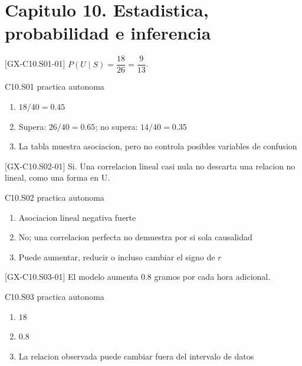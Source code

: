 \section*{Capitulo 10. Estadistica, probabilidad e inferencia}

\begin{shortanswer}{[GX-C10.S01-01]}
\(P(U\mid S)=\dfrac{18}{26}=\dfrac9{13}\).
\end{shortanswer}

\begin{shortanswer}{C10.S01 practica autonoma}
\begin{enumerate}[label=\textbf{PX-C10.S01-\arabic*:}, leftmargin=*]
  \item \(18/40=0.45\)
  \item Supera: \(26/40=0.65\); no supera: \(14/40=0.35\)
  \item La tabla muestra asociacion, pero no controla posibles variables de confusion
\end{enumerate}
\end{shortanswer}

\begin{shortanswer}{[GX-C10.S02-01]}
Si. Una correlacion lineal casi nula no descarta una relacion no lineal, como una forma en U.
\end{shortanswer}

\begin{shortanswer}{C10.S02 practica autonoma}
\begin{enumerate}[label=\textbf{PX-C10.S02-\arabic*:}, leftmargin=*]
  \item Asociacion lineal negativa fuerte
  \item No; una correlacion perfecta no demuestra por si sola causalidad
  \item Puede aumentar, reducir o incluso cambiar el signo de \(r\)
\end{enumerate}
\end{shortanswer}

\begin{shortanswer}{[GX-C10.S03-01]}
El modelo aumenta \(0.8\) gramos por cada hora adicional.
\end{shortanswer}

\begin{shortanswer}{C10.S03 practica autonoma}
\begin{enumerate}[label=\textbf{PX-C10.S03-\arabic*:}, leftmargin=*]
  \item \(18\)
  \item \(0.8\)
  \item La relacion observada puede cambiar fuera del intervalo de datos
\end{enumerate}
\end{shortanswer}


